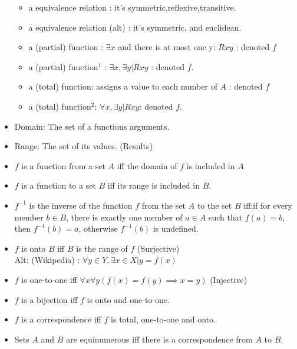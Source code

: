 \begin{itemize}
\begin{itemize}
\item a equivalence relation : it's symmetric,reflexive,transitive.
\item a equivalence relation (alt) : it's symmetric, and euclidean.
\item a (partial) function : $\exists x$ and there is at most one y: $Rxy$ : denoted $f$
\item a (partial) function$^{1}$ :  $\exists x , \exists y | Rxy$ : denoted $f$.
\item a (total) function: assigns a value to each number of $A$ : denoted $f$
\item a (total) function$^{2}$: $\forall x , \exists y | Rxy$: denoted $f$.

\end{itemize}

\item Domain: The set of a functions arguments. 
\item Range: The set of its values. (Results) 
\item $f$ is a function from a set $A$ iff the domain of $f$ is included in $A$ 

\item $f$ is a function to a set $B$ iff its range is included in $B$. 

\item $f^{-1}$ is the inverse of the function $f$ from the set $A$ to the set $B$ iff:if for every member $b \in B$, there is exactly one member of $a \in A$ such that $f(a)=b$, then $f^{-1}(b)=a$, otherwise $f^{-1}(b)$ is undefined.

\item $f$ is onto $B$ iff $B$ is the range of $f$ (Surjective) \\ 
Alt: (Wikipedia) : $\forall y \in Y, \exists x \in X | y=f(x)$
\item $f$ is one-to-one iff $\forall x \forall y (f(x)=f(y)\implies x=y)$ (Injective)
\item $f$ is a bijection iff $f$ is onto and one-to-one.
\item $f$ is a correspondence iff $f$ is total, one-to-one and onto.
\item Sets $A$ and $B$ are equinumerous iff there is a correspondence from $A$ to $B$.%
\end{itemize}



